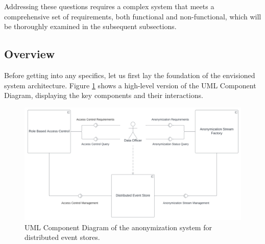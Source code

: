 Addressing these questions requires a complex system that meets a comprehensive set of requirements, both functional and non-functional, which will be thoroughly examined in the subsequent subsections. 

\subsection{Overview\label{sec:model_architecture}}
Before getting into any specifics, let us first lay the foundation of the envisioned system architecture. Figure \ref{fig:componentDiagram} shows a high-level version of the UML Component Diagram, displaying the key components and their interactions. 

\bigskip 

\begin{figure}[ht]
    \begin{adjustbox}{center}
    \includegraphics[width=0.8\pdfpagewidth]{img/Component_Diagram.pdf}
    \end{adjustbox}
    \caption{UML Component Diagram of the anonymization system for distributed event stores. \label{fig:componentDiagram}}
\end{figure}

